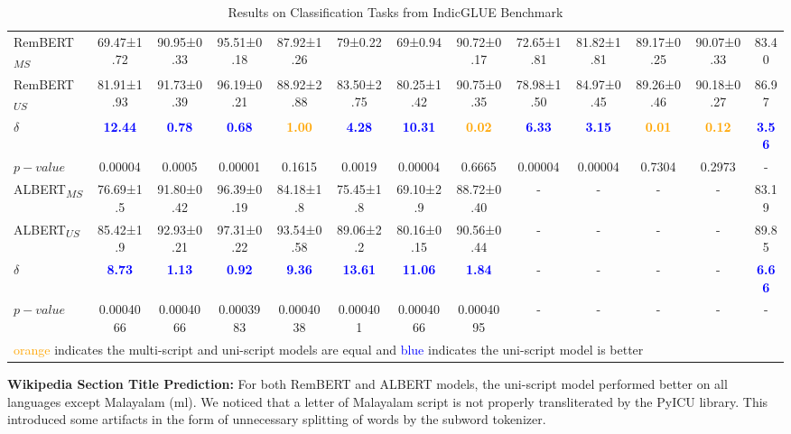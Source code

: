 \documentclass[11pt]{article}
\begin{document}
\begin{table*}[hbt!]
\begin{adjustbox}{max width=\textwidth}
\begin{tabular}{l c c c c c c c c c c c c}
RemBERT\textsubscript{$MS$}  & 69.47±1.72 & 90.95±0.33 & 95.51±0.18 & 87.92±1.26 & 79±0.22 & 69±0.94 & 90.72±0.17 & 72.65±1.81 & 81.82±1.81 & 89.17±0.25 & 90.07±0.33 & 83.40\\
RemBERT\textsubscript{$US$}   & 81.91±1.93 & 91.73±0.39 & 96.19±0.21 & 88.92±2.88 & 83.50±2.75 & 80.25±1.42 & 90.75±0.35 & 78.98±1.50 & 84.97±0.45 & 89.26±0.46 & 90.18±0.27 & 86.97\\
$\delta$ &\textcolor{blue}{\textbf{12.44}}	&\textcolor{blue}{\textbf{0.78}}	&\textcolor{blue}{\textbf{0.68}}	&\textcolor{orange}{\textbf{1.00}}	&\textcolor{blue}{\textbf{4.28}}	&\textcolor{blue}{\textbf{10.31}}	&\textcolor{orange}{\textbf{0.02}} &\textcolor{blue}{\textbf{6.33}} &\textcolor{blue}{\textbf{3.15}} &\textcolor{orange}{\textbf{0.01}} &\textcolor{orange}{\textbf{0.12}} & \textcolor{blue}{\textbf{3.56}} \\
$p-value$ &0.00004	&0.0005	&0.00001	&0.1615	&0.0019	&0.00004	&0.6665 &0.00004 &0.00004 & 0.7304 & 0.2973 & -\\
\midrule[1pt]
ALBERT\textsubscript{$MS$}           & 76.69±1.5 & 91.80±0.42 & 96.39±0.19 & 84.18±1.8 & 75.45±1.8 & 69.10±2.9 & 88.72±0.40 & - &- & - & - & 83.19\\
ALBERT\textsubscript{$US$}   & 85.42±1.9 & 92.93±0.21 & 97.31±0.22 & 93.54±0.58 & 89.06±2.2 & 80.16±0.15 & 90.56±0.44 & - &- & - & - & 89.85\\
$\delta$ & \textcolor{blue}{\textbf{8.73}} & \textcolor{blue}{\textbf{1.13}} & \textcolor{blue}{\textbf{0.92}} & \textcolor{blue}{\textbf{9.36}} & \textcolor{blue}{\textbf{13.61}} & \textcolor{blue}{\textbf{11.06}} & \textcolor{blue}{\textbf{1.84}} & - & - & - & - & \textcolor{blue}{\textbf{6.66}}\\
$p-value$ & 0.0004066	& 0.0004066	& 0.0003983	& 0.0004038	& 0.000401	& 0.0004066	& 0.0004095 & - & - & - & - & -\\
\bottomrule[2pt]
\multicolumn{13}{l}{\textcolor{orange}{orange} indicates the multi-script and uni-script models are equal and \textcolor{blue}{blue} indicates the uni-script model is better}
\end{tabular}\end{adjustbox}
\caption{Results on Classification Tasks from IndicGLUE Benchmark}
\label{table-res}
\end{table*}


\textbf{Wikipedia Section Title Prediction:}
For both RemBERT and ALBERT models, the uni-script model performed better on all languages except Malayalam (ml). We noticed that a letter of Malayalam script is not properly transliterated by the PyICU library. This introduced some artifacts in the form of unnecessary splitting of words by the subword tokenizer.
\end{document}
